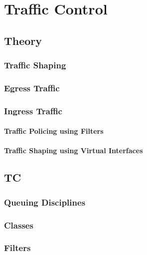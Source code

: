 \chapter{Traffic Control}
\section{Theory}
\subsection{Traffic Shaping}
\subsection{Egress Traffic}
\subsection{Ingress Traffic}
\subsubsection{Traffic Policing using Filters}
\subsubsection{Traffic Shaping using Virtual Interfaces}
\section{TC}
\subsection{Queuing Disciplines}
\subsection{Classes}
\subsection{Filters}